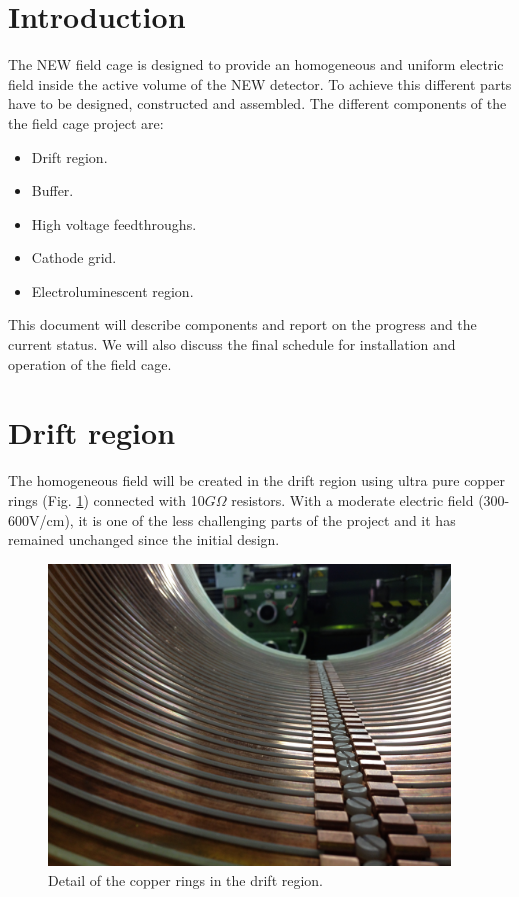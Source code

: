 \section{Introduction} \label{sec:Introduction} 


The NEW field cage is designed to provide an homogeneous and uniform electric field inside the active volume of the NEW detector. To achieve this different parts have to be designed, constructed and assembled. The different components of the the field cage project are:
\begin{itemize}
\item Drift region.
\item Buffer.
\item High voltage feedthroughs.
\item Cathode grid.
\item Electroluminescent region.
\end{itemize}


This document will describe components and report on the progress and the current status. We will also discuss  the final schedule for installation and operation of the field cage.


\section{Drift region}

The homogeneous field will be created in the drift region using ultra pure copper rings (Fig. \ref{fig:drift1}) connected with 10$G\Omega$ resistors. With a moderate electric field (300-600V/cm), it is one of the less challenging parts of the project and it has remained unchanged since the initial design.

\begin{figure}[h!]
\centering
\includegraphics[height=8cm]{img/IMG_0246.JPG}
\caption{Detail of the copper rings in the drift region.} \label{fig:drift1}
\end{figure}



